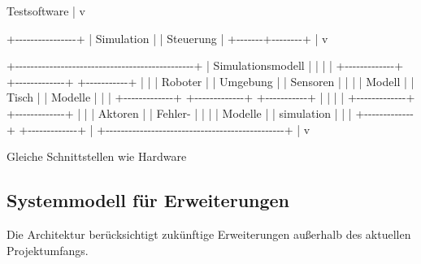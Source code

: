 \documentclass[
  a4paper,
  12pt,
  DIV=12,        %
  parskip=half,  %
  headings=small %
]{scrartcl}
\theoremstyle{definition}
\theoremstyle{definition}
\newenvironment{Shaded}{}{}
\newcommand{\NormalTok}[1]{#1}
\begin{document}
\begin{Shaded}
\begin{Highlighting}[]
\NormalTok{                 Testsoftware}
\NormalTok{                      |}
\NormalTok{                      v}

\NormalTok{             +{-}{-}{-}{-}{-}{-}{-}{-}{-}{-}{-}{-}{-}{-}{-}{-}+}
\NormalTok{             | Simulation     |}
\NormalTok{             | Steuerung      |}
\NormalTok{             +{-}{-}{-}{-}{-}{-}{-}+{-}{-}{-}{-}{-}{-}{-}{-}+}
\NormalTok{                     |}
\NormalTok{                     v}

\NormalTok{+{-}{-}{-}{-}{-}{-}{-}{-}{-}{-}{-}{-}{-}{-}{-}{-}{-}{-}{-}{-}{-}{-}{-}{-}{-}{-}{-}{-}{-}{-}{-}{-}{-}{-}{-}{-}{-}{-}{-}{-}{-}{-}{-}{-}{-}{-}{-}+}
\NormalTok{|              Simulationsmodell                |}
\NormalTok{|                                               |}
\NormalTok{| +{-}{-}{-}{-}{-}{-}{-}{-}{-}{-}{-}{-}{-}+ +{-}{-}{-}{-}{-}{-}{-}{-}{-}{-}{-}{-}{-}+ +{-}{-}{-}{-}{-}{-}{-}{-}{-}{-}{-}+ |}
\NormalTok{| | Roboter     | | Umgebung    | | Sensoren  | |}
\NormalTok{| | Modell      | | Tisch       | | Modelle   | |}
\NormalTok{| +{-}{-}{-}{-}{-}{-}{-}{-}{-}{-}{-}{-}{-}+ +{-}{-}{-}{-}{-}{-}{-}{-}{-}{-}{-}{-}{-}+ +{-}{-}{-}{-}{-}{-}{-}{-}{-}{-}{-}+ |}
\NormalTok{|                                               |}
\NormalTok{| +{-}{-}{-}{-}{-}{-}{-}{-}{-}{-}{-}{-}{-}+ +{-}{-}{-}{-}{-}{-}{-}{-}{-}{-}{-}{-}{-}+               |}
\NormalTok{| | Aktoren     | | Fehler{-}     |               |}
\NormalTok{| | Modelle     | | simulation  |               |}
\NormalTok{| +{-}{-}{-}{-}{-}{-}{-}{-}{-}{-}{-}{-}{-}+ +{-}{-}{-}{-}{-}{-}{-}{-}{-}{-}{-}{-}{-}+               |}
\NormalTok{+{-}{-}{-}{-}{-}{-}{-}{-}{-}{-}{-}{-}{-}{-}{-}{-}{-}{-}{-}{-}{-}{-}{-}{-}{-}{-}{-}{-}{-}{-}{-}{-}{-}{-}{-}{-}{-}{-}{-}{-}{-}{-}{-}{-}{-}{-}{-}+}
\NormalTok{                     |}
\NormalTok{                     v}

\NormalTok{          Gleiche Schnittstellen wie Hardware}
\end{Highlighting}
\end{Shaded}

\subsection{Systemmodell für
Erweiterungen}\label{systemmodell-fuxfcr-erweiterungen}

Die Architektur berücksichtigt zukünftige Erweiterungen außerhalb des
aktuellen Projektumfangs.
\end{document}
